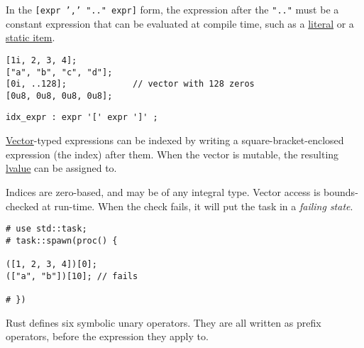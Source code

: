 \documentclass[]{article}
\begin{document}
In the \texttt{{[}expr ',' ".." expr{]}} form, the expression after the
\texttt{".."} must be a constant expression that can be evaluated at
compile time, such as a \hyperref[literals]{literal} or a
\hyperref[static-items]{static item}.

\begin{verbatim}
[1i, 2, 3, 4];
["a", "b", "c", "d"];
[0i, ..128];             // vector with 128 zeros
[0u8, 0u8, 0u8, 0u8];
\end{verbatim}


\begin{verbatim}
idx_expr : expr '[' expr ']' ;
\end{verbatim}

\hyperref[vector-types]{Vector}-typed expressions can be indexed by
writing a square-bracket-enclosed expression (the index) after them.
When the vector is mutable, the resulting
\hyperref[lvalues-rvalues-and-temporaries]{lvalue} can be assigned to.

Indices are zero-based, and may be of any integral type. Vector access
is bounds-checked at run-time. When the check fails, it will put the
task in a \emph{failing state}.

\begin{verbatim}
# use std::task;
# task::spawn(proc() {

([1, 2, 3, 4])[0];
(["a", "b"])[10]; // fails

# })
\end{verbatim}


Rust defines six symbolic unary operators. They are all written as
prefix operators, before the expression they apply to.
\end{document}
